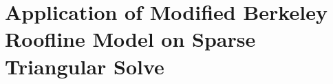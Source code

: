 \section[Application of Modified Berkeley Roofline Model]{Application of Modified Berkeley Roofline Model on Sparse Triangular Solve}
\label{sec:mrm}


